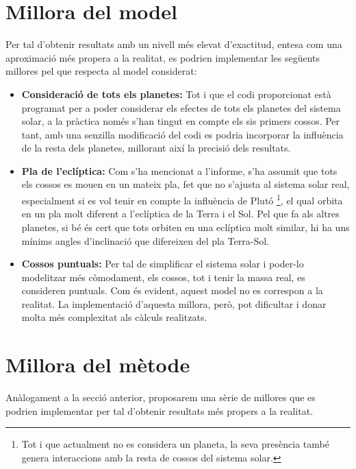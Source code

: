 \documentclass[10pt, twoside, a4paper]{article}
\begin{document}
\section{Millora del model}
Per tal d'obtenir resultats amb un nivell més elevat d'exactitud, entesa com una aproximació més propera a la realitat, es podrien implementar les següents millores pel que respecta al model considerat:
\begin{itemize}
    \item \textbf{Consideració de tots els planetes: } Tot i que el codi proporcionat està programat per a poder considerar els efectes de tots els planetes del sistema solar, a la pràctica només s'han tingut en compte els sis primers cossos. Per tant, amb una senzilla modificació del codi es podria incorporar la influència de la resta dels planetes, millorant així la precisió dels resultats.
    \item \textbf{Pla de l'eclíptica: } Com s'ha mencionat a l'informe, s'ha assumit que tots els cossos es mouen en un mateix pla, fet que no s'ajusta al sistema solar real, especialment si es vol tenir en compte la influència de Plutó \footnote{Tot i que actualment no es considera un planeta, la seva presència també genera interaccions amb la resta de cossos del sistema solar.}, el qual orbita en un pla molt diferent a l'eclíptica de la Terra i el Sol. Pel que fa als altres planetes, si bé és cert que tots orbiten en una eclíptica molt similar, hi ha uns mínims angles d'inclinació que difereixen del pla Terra-Sol.
    \item \textbf{Cossos puntuals: }Per tal de simplificar el sistema solar i poder-lo modelitzar més còmodament, els cossos, tot i tenir la massa real, es consideren puntuals. Com és evident, aquest model no es correspon a la realitat. La implementació d'aquesta millora, però, pot dificultar i donar molta més complexitat als càlculs realitzats.
\end{itemize}

\section{Millora del mètode}
Anàlogament a la secció anterior, proposarem una sèrie de millores que es podrien implementar per tal d'obtenir resultats més propers a la realitat.
\end{document}

